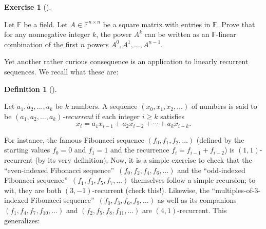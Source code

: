 \documentclass[numbers=enddot,12pt,final,onecolumn,notitlepage]{scrartcl}%
\newcounter{exer}
\numberwithin{exer}{subsection}
\theoremstyle{definition}
\newtheorem{defi}[theo]{Definition}
\newenvironment{definition}[1][]
{\begin{defi}[#1]\begin{leftbar}}
{\end{leftbar}\end{defi}}
\newtheorem{exmp}[exer]{Exercise}
\newenvironment{exercise}[1][]
{\begin{exmp}[#1]\begin{leftbar}}
{\end{leftbar}\end{exmp}}
\begin{document}
\begin{exercise}
\label{exe.schurtri.ch.powers-span} Let $\mathbb{F}$ be a field. Let
$A\in\mathbb{F}^{n\times n}$ be a square matrix with entries in $\mathbb{F}$.
Prove that for any nonnegative integer $k$, the power $A^{k}$ can be written
as an $\mathbb{F}$-linear combination of the first $n$ powers $A^{0}%
,A^{1},\ldots,A^{n-1}$.
\end{exercise}

Yet another rather curious consequence is an application to linearly recurrent
sequences. We recall what these are:

\begin{definition}
Let $a_{1},a_{2},\ldots,a_{k}$ be $k$ numbers. A sequence $\left(  x_{0}%
,x_{1},x_{2},\ldots\right)  $ of numbers is said to be $\left(  a_{1}%
,a_{2},\ldots,a_{k}\right)  $\emph{-recurrent} if each integer $i\geq k$
satisfies%
\[
x_{i}=a_{1}x_{i-1}+a_{2}x_{i-2}+\cdots+a_{k}x_{i-k}.
\]

\end{definition}

For instance, the famous Fibonacci sequence $\left(  f_{0},f_{1},f_{2}%
,\ldots\right)  $ (defined by the starting values $f_{0}=0$ and $f_{1}=1$ and
the recurrence $f_{i}=f_{i-1}+f_{i-2}$) is $\left(  1,1\right)  $-recurrent
(by its very definition). Now, it is a simple exercise to check that the
\textquotedblleft even-indexed Fibonacci sequence\textquotedblright\ $\left(
f_{0},f_{2},f_{4},f_{6},\ldots\right)  $ and the \textquotedblleft odd-indexed
Fibonacci sequence\textquotedblright\ $\left(  f_{1},f_{3},f_{5},f_{7}%
,\ldots\right)  $ themselves follow a simple recursion; to wit, they are both
$\left(  3,-1\right)  $-recurrent (check this!). Likewise, the
\textquotedblleft multiples-of-$3$-indexed Fibonacci
sequence\textquotedblright\ $\left(  f_{0},f_{3},f_{6},f_{9},\ldots\right)  $
as well as its companions $\left(  f_{1},f_{4},f_{7},f_{10},\ldots\right)  $
and $\left(  f_{2},f_{5},f_{8},f_{11},\ldots\right)  $ are $\left(
4,1\right)  $-recurrent. This generalizes:
\end{document}
